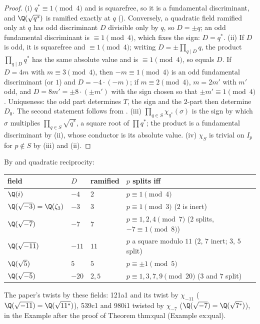 \begin{proof}
(i) $q^*\equiv1\pmod4$ and is squarefree, so it is a fundamental discriminant, and $\Q(\sqrt{q^*})$ is ramified exactly at $q$ ().
Conversely, a quadratic field ramified only at $q$ has odd discriminant $D$ divisible only by $q$, so $D=\pm q$; an odd fundamental discriminant is
$\equiv1\pmod4$, which fixes the sign: $D=q^*$. (ii) If $D$ is odd, it is squarefree and $\equiv1\pmod 4$; writing $D=\pm\prod_{q\mid D}q$, the product
$\prod_{q\mid D}q^*$ has the same absolute value and is $\equiv1\pmod4$, so equals $D$. If $D=4m$ with $m\equiv3\pmod4$, then $-m\equiv1\pmod 4$ is an odd
fundamental discriminant (or $1$) and $D=-4\cdot(-m)$; if $m\equiv2\pmod4$, $m=2m'$ with $m'$ odd, and $D=8m'=\pm8\cdot(\pm m')$ with the sign chosen so that
$\pm m'\equiv1\pmod 4$. Uniqueness: the odd part determines $T$, the sign and the $2$-part then determine $D_0$. The second statement follows from
. (iii) $\prod_{q\in S}\chi_{q^*}(\sigma)$ is the sign by which $\sigma$ multiplies $\prod_{q\in S}\sqrt{q^*}$, a square root of $\prod q^*$;
the product is a fundamental discriminant by (ii), whose conductor is its absolute value. (iv) $\chi_S$ is trivial on $I_p$ for $p\notin S$ by (iii) and
(ii).
\end{proof}

\begin{example}\label{ex:ant:quadexamples}
By  and quadratic reciprocity:
\begin{center}\small
\begin{tabular}{llll}
\toprule
field & $D$ & ramified & $p$ splits iff\\
\midrule
$\Q(i)$ & $-4$ & $2$ & $p\equiv1\pmod4$\\
$\Q(\sqrt{-3})=\Q(\zeta_3)$ & $-3$ & $3$ & $p\equiv1\pmod3$ ($2$ is inert)\\
$\Q(\sqrt{-7})$ & $-7$ & $7$ & $p\equiv1,2,4\pmod7$ ($2$ splits, $-7\equiv1\pmod8$)\\
$\Q(\sqrt{-11})$ & $-11$ & $11$ & $p$ a square modulo $11$ ($2$, $7$ inert; $3$, $5$ split)\\
$\Q(\sqrt5)$ & $5$ & $5$ & $p\equiv\pm1\pmod5$\\
$\Q(\sqrt{-5})$ & $-20$ & $2,5$ & $p\equiv1,3,7,9\pmod{20}$ ($3$ and $7$ split)\\
\bottomrule
\end{tabular}
\end{center}
The paper's twists by these fields: 121a1 and its twist by $\chi_{-11}$ ($\Q(\sqrt{-11})=\Q(\sqrt{11^*})$), 539c1 and 980i1 twisted by $\chi_{-7}$
($\Q(\sqrt{-7})=\Q(\sqrt{7^*})$), in the Example after the proof of Theorem thm:qual (Example ex:qual).
\end{example}

